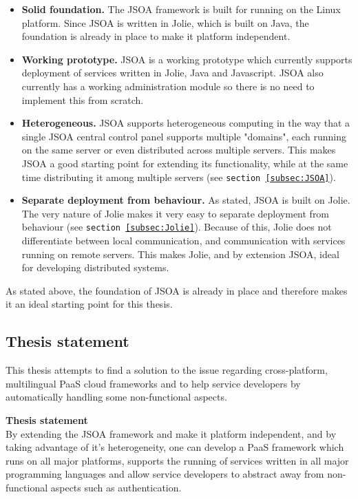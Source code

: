 \documentclass[12pt,a4paper]{article}
\begin{document}
\begin{itemize}
\item \textbf{Solid foundation.} The JSOA framework is built for running on the Linux platform. Since JSOA is written in Jolie, which is built on Java, the foundation is already in place to make it platform independent.

\item \textbf{Working prototype.} JSOA is a working prototype which currently supports deployment of services written in Jolie, Java and Javascript. JSOA also currently has a working administration module so there is no need to implement this from scratch.

\item \textbf{Heterogeneous.} JSOA supports heterogeneous computing in the way that a single JSOA central control panel supports multiple "domains", each running on the same server or even distributed across multiple servers. This makes JSOA a good starting point for extending its functionality, while at the same time distributing it among multiple servers (see \texttt{section \ref{subsec:JSOA}}).

\item \textbf{Separate deployment from behaviour.} As stated, JSOA is built on Jolie. The very nature of Jolie makes it very easy to separate deployment from behaviour (see \texttt{section \ref{subsec:Jolie}}). Because of this, Jolie does not differentiate between local communication, and communication with services running on remote servers. This makes Jolie, and by extension JSOA, ideal for developing distributed systems. 
\end{itemize}

As stated above, the foundation of JSOA is already in place and therefore makes it an ideal starting point for this thesis.

\subsection{Thesis statement}\label{subsec:ThesisStatement}
This thesis attempts to find a solution to the issue regarding cross-platform, multilingual PaaS cloud frameworks and to help service developers by automatically handling some non-functional aspects. \\

\begin{mdframed}
\textbf{Thesis statement}\\
By extending the JSOA framework and make it platform independent, and by taking advantage of it's heterogeneity, one can develop a PaaS framework which runs on all major platforms, supports the running of services written in all major programming languages and allow service developers to abstract away from non-functional aspects such as authentication.
\end{mdframed}
\end{document}
